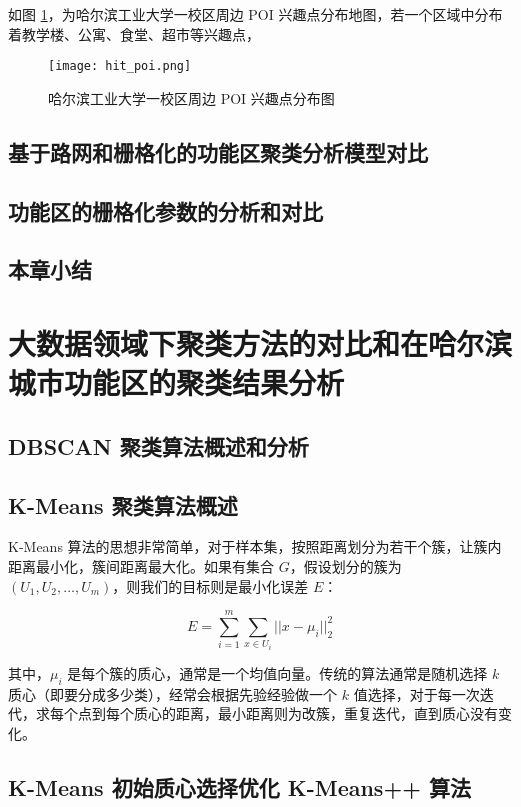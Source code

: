 如图 \ref{fig:hit_poi}，为哈尔滨工业大学一校区周边 POI 兴趣点分布地图，若一个区域中分布着教学楼、公寓、食堂、超市等兴趣点，

\begin{figure}[htbp]
    \centering
    \texttt{[image: hit\_poi.png]}
    \caption{哈尔滨工业大学一校区周边 POI 兴趣点分布图}
    \label{fig:hit_poi}
\end{figure}

\section{基于路网和栅格化的功能区聚类分析模型对比}

\section{功能区的栅格化参数的分析和对比}

\section{本章小结}

\chapter{大数据领域下聚类方法的对比和在哈尔滨城市功能区的聚类结果分析}

\section{DBSCAN 聚类算法概述和分析}

\section{K-Means 聚类算法概述}

K-Means 算法的思想非常简单，对于样本集，按照距离划分为若干个簇，让簇内距离最小化，簇间距离最大化。如果有集合 $G$，假设划分的簇为\\ $(U_1, U_2, \dots, U_m)$，则我们的目标则是最小化误差 $E$：

$$
E = \sum_{i=1}^{m}\sum_{x \in U_{i}} ||x - \mu_{i}||^{2}_{2}
$$

其中，$\mu_{i}$ 是每个簇的质心，通常是一个均值向量。传统的算法通常是随机选择 $k$ 质心（即要分成多少类），经常会根据先验经验做一个 $k$ 值选择，对于每一次迭代，求每个点到每个质心的距离，最小距离则为改簇，重复迭代，直到质心没有变化。

\section{K-Means 初始质心选择优化 K-Means++ 算法}

